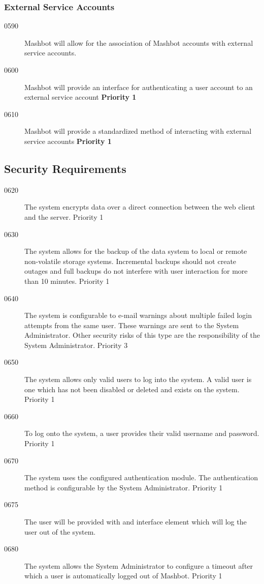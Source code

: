 \documentclass{article}
\begin{document}
\begin{description}
\subsubsection{External Service Accounts} %

\begin{description}
\item[0590] Mashbot will allow for the association of Mashbot accounts with
  external service accounts.

\item[0600] Mashbot will provide an interface for authenticating a user
  account to an external service account \textbf{Priority 1}
\item[0610] Mashbot will provide a standardized method of interacting with
  external service accounts \textbf{Priority 1}
\end{description}

\subsection{Security Requirements} %
\begin{description}
\item[0620] The system encrypts data over a direct connection between the
  web client and the server.  Priority 1
\item[0630] The system allows for the backup of the data system to local or
  remote non-volatile storage systems.  Incremental backups should not
  create outages and full backups do not interfere with user
  interaction for more than 10 minutes. Priority 1
\item[0640] The system is configurable to e-mail warnings about multiple
  failed login attempts from the same user. These warnings are sent to
  the System Administrator. Other security risks of this type are the
  responsibility of the System Administrator. Priority 3
\item[0650] The system allows only valid users to log into the system. A
  valid user is one which has not been disabled or deleted and exists
  on the system. Priority 1
\item[0660] To log onto the system, a user provides their valid username and
  password. Priority 1
\item[0670] The system uses the configured authentication module. The
  authentication method is configurable by the System
  Administrator. Priority 1
\item[0675] The user will be provided with and interface element which
  will log the user out of the system.
\item[0680] The system allows the System Administrator to configure a
  timeout after which a user is automatically logged out of
  Mashbot. Priority 1
\end{description}


\end{description}
\end{document}
